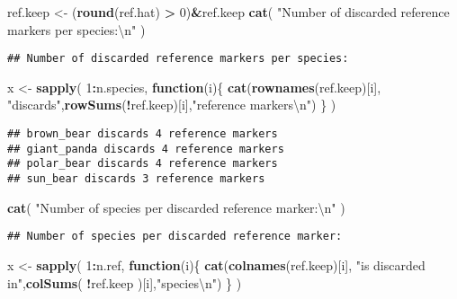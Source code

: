 \documentclass[]{article}
\newenvironment{Shaded}{\begin{snugshade}}{\end{snugshade}}
\newcommand{\KeywordTok}[1]{\textcolor[rgb]{0.13,0.29,0.53}{\textbf{#1}}}
\newcommand{\DecValTok}[1]{\textcolor[rgb]{0.00,0.00,0.81}{#1}}
\newcommand{\CharTok}[1]{\textcolor[rgb]{0.31,0.60,0.02}{#1}}
\newcommand{\StringTok}[1]{\textcolor[rgb]{0.31,0.60,0.02}{#1}}
\newcommand{\ControlFlowTok}[1]{\textcolor[rgb]{0.13,0.29,0.53}{\textbf{#1}}}
\newcommand{\OperatorTok}[1]{\textcolor[rgb]{0.81,0.36,0.00}{\textbf{#1}}}
\newcommand{\NormalTok}[1]{#1}
\begin{document}
\begin{Shaded}
\begin{Highlighting}[]
\NormalTok{ref.keep <-}\StringTok{ }\NormalTok{(}\KeywordTok{round}\NormalTok{(ref.hat) }\OperatorTok{>}\StringTok{ }\DecValTok{0}\NormalTok{)}\OperatorTok{&}\NormalTok{ref.keep}
\KeywordTok{cat}\NormalTok{( }\StringTok{"Number of discarded reference markers per species:}\CharTok{\textbackslash{}n}\StringTok{"}\NormalTok{ )}
\end{Highlighting}
\end{Shaded}

\begin{verbatim}
## Number of discarded reference markers per species:
\end{verbatim}

\begin{Shaded}
\begin{Highlighting}[]
\NormalTok{x <-}\StringTok{ }\KeywordTok{sapply}\NormalTok{( }\DecValTok{1}\OperatorTok{:}\NormalTok{n.species, }\ControlFlowTok{function}\NormalTok{(i)\{}
  \KeywordTok{cat}\NormalTok{(}\KeywordTok{rownames}\NormalTok{(ref.keep)[i], }\StringTok{"discards"}\NormalTok{,}\KeywordTok{rowSums}\NormalTok{(}\OperatorTok{!}\NormalTok{ref.keep)[i],}\StringTok{"reference markers}\CharTok{\textbackslash{}n}\StringTok{"}\NormalTok{)}
\NormalTok{\} )}
\end{Highlighting}
\end{Shaded}

\begin{verbatim}
## brown_bear discards 4 reference markers
## giant_panda discards 4 reference markers
## polar_bear discards 4 reference markers
## sun_bear discards 3 reference markers
\end{verbatim}

\begin{Shaded}
\begin{Highlighting}[]
\KeywordTok{cat}\NormalTok{( }\StringTok{"Number of species per discarded reference marker:}\CharTok{\textbackslash{}n}\StringTok{"}\NormalTok{ )}
\end{Highlighting}
\end{Shaded}

\begin{verbatim}
## Number of species per discarded reference marker:
\end{verbatim}

\begin{Shaded}
\begin{Highlighting}[]
\NormalTok{x <-}\StringTok{ }\KeywordTok{sapply}\NormalTok{( }\DecValTok{1}\OperatorTok{:}\NormalTok{n.ref, }\ControlFlowTok{function}\NormalTok{(i)\{}
  \KeywordTok{cat}\NormalTok{(}\KeywordTok{colnames}\NormalTok{(ref.keep)[i], }\StringTok{"is discarded in"}\NormalTok{,}\KeywordTok{colSums}\NormalTok{( }\OperatorTok{!}\NormalTok{ref.keep )[i],}\StringTok{"species}\CharTok{\textbackslash{}n}\StringTok{"}\NormalTok{)}
\NormalTok{\} )}
\end{Highlighting}
\end{Shaded}
\end{document}
